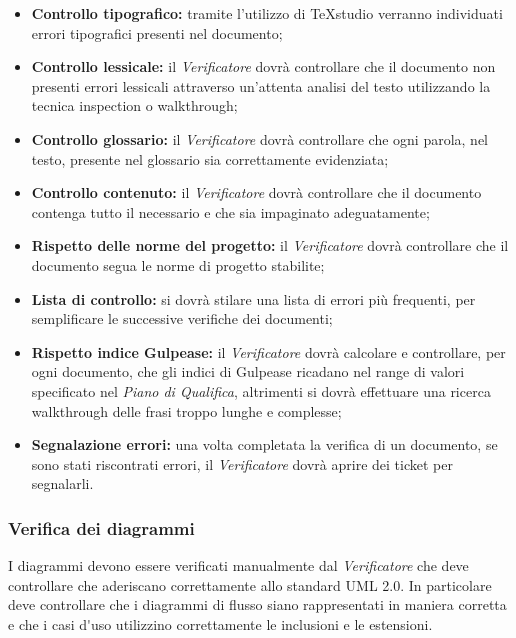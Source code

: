 \begin{itemize}
	\item \textbf{Controllo tipografico: }tramite l'utilizzo di TeXstudio verranno individuati errori tipografici presenti nel documento;
	\item \textbf{Controllo lessicale: }il \textit{Verificatore} dovrà controllare che il documento non presenti errori lessicali attraverso un'attenta analisi del testo utilizzando la tecnica \gls{inspection} o \gls{walkthrough};
	\item \textbf{Controllo glossario: }il \textit{Verificatore} dovrà controllare che ogni parola, nel testo, presente nel glossario sia correttamente evidenziata;
	\item \textbf{Controllo contenuto: }il \textit{Verificatore} dovrà controllare che il documento contenga tutto il necessario e che sia impaginato adeguatamente;
	\item \textbf{Rispetto delle norme del progetto: }il \textit{Verificatore} dovrà controllare che il documento segua le norme di progetto stabilite;
	\item \textbf{Lista di controllo: }si dovrà stilare una lista di errori più frequenti, per semplificare le successive verifiche dei documenti;
	\item \textbf{Rispetto \gls{indice Gulpease}: }il \textit{Verificatore} dovrà calcolare e controllare, per ogni documento, che gli \gls{indici di Gulpease} ricadano nel range di valori specificato nel \textit{Piano di Qualifica}, altrimenti si dovrà effettuare una ricerca \gls{walkthrough} delle frasi troppo lunghe e complesse;
	\item \textbf{Segnalazione errori: }una volta completata la verifica di un documento, se sono stati riscontrati errori, il \textit{Verificatore} dovrà aprire dei \gls{ticket} per segnalarli.
\end{itemize}
	
\subsubsection{Verifica dei diagrammi}
I diagrammi devono essere verificati manualmente dal \textit{Verificatore} che deve controllare che aderiscano correttamente allo standard \gls{UML} 2.0.
In particolare deve controllare che i diagrammi di flusso siano rappresentati in maniera corretta e che i \gls{casi d'uso} utilizzino correttamente le inclusioni e le estensioni.